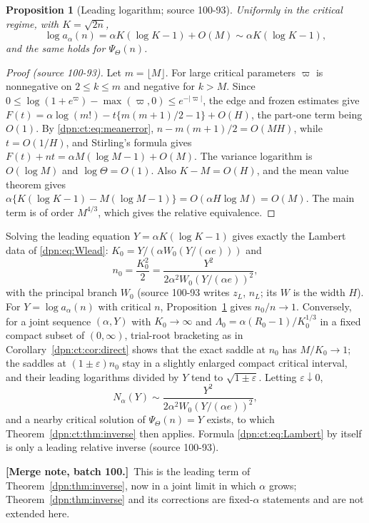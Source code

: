 \documentclass[11pt]{article}
\numberwithin{equation}{section}
\newtheorem{proposition}[theorem]{Proposition}
\theoremstyle{definition}\newtheorem{definition}[theorem]{Definition}
\theoremstyle{remark}\newtheorem{remark}[theorem]{Remark}
\newcommand{\src}[1]{\textup{(source #1)}}
\newcommand{\mergenoted}[1]{\par\smallskip\noindent\textbf{[Merge note, batch 100.]}\ #1\par\smallskip}
\begin{document}
\begin{proposition}[Leading logarithm; source 100-93]\label{dpn:ct:prop:leadinglog}
Uniformly in the critical regime, with $K=\sqrt{2n}$,
\begin{equation}\label{dpn:ct:eq:leadinglog}
 \log a_\alpha(n)=\alpha K(\log K-1)+O(M)\sim\alpha K(\log K-1),
\end{equation}
and the same holds for $\Psi_\Theta(n)$.
\end{proposition}
\begin{proof}[Proof \src{100-93}]
Let $m=\lfloor M\rfloor$.  For large critical parameters $\varpi$ is nonnegative
on $2\le k\le m$ and negative for $k>M$.  Since
$0\le\log(1+e^\varpi)-\max(\varpi,0)\le e^{-|\varpi|}$, the edge and frozen
estimates give $F(t)=\alpha\log(m!)-t\{m(m+1)/2-1\}+O(H)$, the part-one term
being $O(1)$.  By \eqref{dpn:ct:eq:meanerror}, $n-m(m+1)/2=O(MH)$, while
$t=O(1/H)$, and Stirling's formula gives $F(t)+nt=\alpha M(\log M-1)+O(M)$.
The variance logarithm is $O(\log M)$ and $\log\Theta=O(1)$.  Also $K-M=O(H)$,
and the mean value theorem gives
$\alpha\{K(\log K-1)-M(\log M-1)\}=O(\alpha H\log M)=O(M)$.  The main term is of
order $M^{4/3}$, which gives the relative equivalence.
\end{proof}
Solving the leading equation $Y=\alpha K(\log K-1)$ gives exactly the Lambert
data of \eqref{dpn:eq:Wlead}: $K_0=Y/(\alpha W_0(Y/(\alpha e)))$ and
\begin{equation}\label{dpn:ct:eq:Lambert}
 n_0=\frac{K_0^2}2=\frac{Y^2}{2\alpha^2W_0(Y/(\alpha e))^2},
\end{equation}
with the principal branch $W_0$ (source 100-93 writes $z_L$, $n_L$; its $W$
is the width $H$).  For $Y=\log a_\alpha(n)$ with critical $n$,
Proposition~\ref{dpn:ct:prop:leadinglog} gives $n_0/n\to1$.  Conversely, for a
joint sequence $(\alpha,Y)$ with $K_0\to\infty$ and
$\Lambda_0=\alpha(R_0-1)/K_0^{1/3}$ in a fixed compact subset of $(0,\infty)$,
trial-root bracketing as in Corollary~\ref{dpn:ct:cor:direct} shows that the
exact saddle at $n_0$ has $M/K_0\to1$; the saddles at $(1\pm\varepsilon)n_0$ stay
in a slightly enlarged compact critical interval, and their leading
logarithms divided by $Y$ tend to $\sqrt{1\pm\varepsilon}$.  Letting
$\varepsilon\downarrow0$,
\begin{equation}\label{dpn:ct:eq:lambertconclusion}
 N_\alpha(Y)\sim\frac{Y^2}{2\alpha^2W_0(Y/(\alpha e))^2},
\end{equation}
and a nearby critical solution of $\Psi_\Theta(n)=Y$ exists, to which
Theorem~\ref{dpn:ct:thm:inverse} then applies.  Formula
\eqref{dpn:ct:eq:Lambert} by itself is only a leading relative inverse
\src{100-93}.
\mergenoted{This is the leading term of Theorem~\ref{dpn:thm:inverse}, now in
a joint limit in which $\alpha$ grows; Theorem~\ref{dpn:thm:inverse} and its
corrections are fixed-$\alpha$ statements and are not extended here.}
\end{document}
